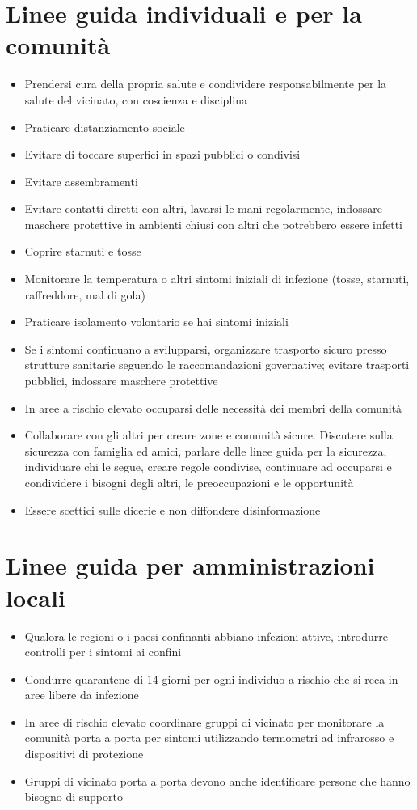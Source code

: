 \documentclass[onecolumn,journal]{IEEEtran}
\begin{document}
\begin{multicols}{2}
\section*{Linee guida individuali e per la comunità}
\begin{itemize}
\item Prendersi cura della propria salute e condividere responsabilmente per la salute del vicinato, con coscienza e disciplina
\item Praticare distanziamento sociale
\item Evitare di toccare superfici in spazi pubblici o condivisi
\item Evitare assembramenti
\item Evitare contatti diretti con altri, lavarsi le mani regolarmente, indossare maschere protettive in ambienti chiusi con altri che potrebbero essere infetti
\item Coprire starnuti e tosse
\item Monitorare la temperatura o altri sintomi iniziali di infezione (tosse, starnuti, raffreddore, mal di gola)
\item Praticare isolamento volontario se hai sintomi iniziali
\item Se i sintomi continuano a svilupparsi, organizzare trasporto sicuro presso strutture sanitarie seguendo le raccomandazioni governative; evitare trasporti pubblici, indossare maschere protettive
\item In aree a rischio elevato occuparsi delle necessità dei membri della comunità
\item Collaborare con gli altri per creare zone e comunità sicure. Discutere sulla sicurezza con famiglia ed amici, parlare delle linee guida per la sicurezza, individuare chi le segue, creare regole condivise, continuare ad occuparsi e condividere i bisogni degli altri, le preoccupazioni e le opportunità
\item Essere scettici sulle dicerie e non diffondere disinformazione
\end{itemize}

\vspace{2ex}

\section*{Linee guida per amministrazioni locali}
\begin{itemize}
\item Qualora le regioni o i paesi confinanti abbiano infezioni attive, introdurre controlli per i sintomi ai confini
\item Condurre quarantene di 14 giorni per ogni individuo a rischio che si reca in aree libere da infezione
\item In aree di rischio elevato coordinare gruppi di vicinato per monitorare la comunità porta a porta per sintomi utilizzando termometri ad infrarosso e dispositivi di protezione
\item Gruppi di vicinato porta a porta devono anche identificare persone che hanno bisogno di supporto


\end{itemize}
\end{multicols}
\end{document}
